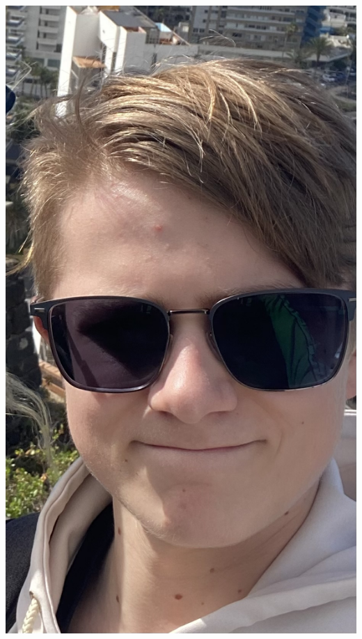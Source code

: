 \documentclass[
	10pt, %
]{FreemanCV}
\begin{document}
\begin{paracol}{2}
\includegraphics[scale=0.2]{./assets/Rill-Malte}



\end{paracol}
\end{document}
